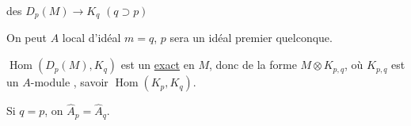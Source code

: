  des  $D_p(M)\longrightarrow K_q$ $(q\supset p)$

On peut  $A$ local d'idéal  $m=q$, $p$ sera un idéal premier quelconque.

 $\operatorname{Hom}(D_p(M),K_q)$ est un  \uline{exact} en $M$, donc de la forme $M\otimes K_{p,q}$, où $K_{p,q}$ est un $A$-module  , savoir $\operatorname{Hom}(K_p,K_q)$.

Si $q=p$, on  $\widehat A_p=\widehat A_q$.
